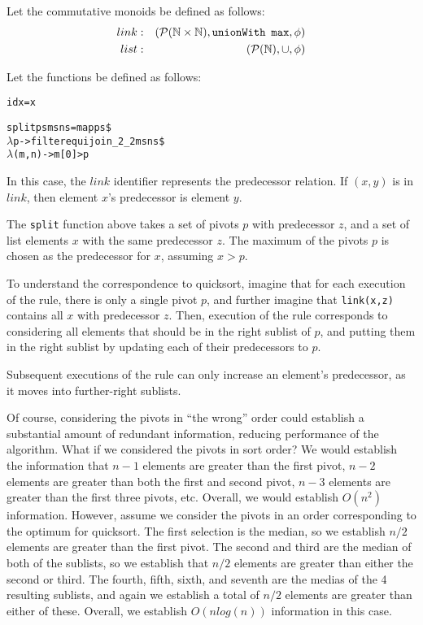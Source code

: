 Let the commutative monoids be defined as follows:
\begin{eqnarray*}
link &:& \left(\mathcal{P}(\mathbb{N} \times \mathbb{N}), {\tt unionWith \,\,\, max}, \phi\right) \\
list &:& \left(\mathcal{P}(\mathbb{N}),\cup, \phi\right) \\
\end{eqnarray*}

Let the functions be defined as follows:
\begin{alltt}
id x = x

split ps ms ns = map ps \$
    \(\lambda\)p -> filter equijoin_2_2 ms ns \$
        \(\lambda\)(m,n) -> m[0] > p
\end{alltt}

In this case, the $link$ identifier represents the predecessor relation.  If $(x,y)$ is in $link$, then element $x$'s predecessor is element $y$.

The {\tt split} function above takes a set of pivots $p$ with predecessor $z$, and a set of list elements $x$ with the same predecessor $z$.  The maximum of the pivots $p$ is chosen as the predecessor for $x$, assuming $x > p$.

To understand the correspondence to quicksort, imagine that for each execution of the rule, there is only a single pivot $p$, and further imagine that {\tt link(x,z)} contains all $x$ with predecessor $z$.  Then, execution of the rule corresponds to considering all elements that should be in the right sublist of $p$, and putting them in the right sublist by updating each of their predecessors to $p$.  

Subsequent executions of the rule can only increase an element's predecessor, as it moves into further-right sublists.

Of course, considering the pivots in ``the wrong'' order could establish a substantial amount of redundant information, reducing performance of the algorithm.  What if we considered the pivots in sort order?  We would establish the information that $n-1$ elements are greater than the first pivot, $n-2$ elements are greater than both the first and second pivot, $n-3$ elements are greater than the first three pivots, etc.  Overall, we would establish $O(n^2)$ information.  However, assume we consider the pivots in an order corresponding to the optimum for quicksort.  The first selection is the median, so we establish $n/2$ elements are greater than the first pivot.  The second and third are the median of both of the sublists, so we establish that $n/2$ elements are greater than either the second or third.  The fourth, fifth, sixth, and seventh are the medias of the 4 resulting sublists, and again we establish a total of $n/2$ elements are greater than either of these.  Overall, we establish $O(n log(n))$ information in this case.

